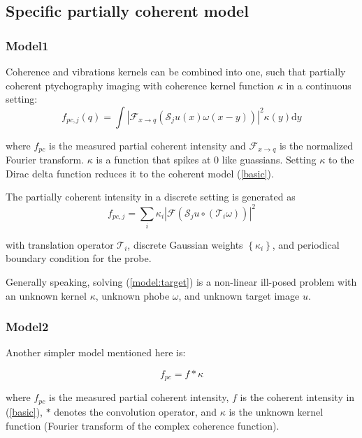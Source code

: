 \documentclass{article}
\numberwithin{equation}{section}
\begin{document}
\subsection{Specific partially coherent model}
 \label{section:specific models}

\subsubsection{Model1\cite{chang}}
Coherence and vibrations kernels can be combined into one, such that partially coherent ptychography imaging with coherence kernel function $\kappa$ in a continuous setting:
\begin{equation}
f_{p c, j}(q) = \int\left|\mathcal{F}_{x \rightarrow q}\left(\mathcal{S}_{j} u(x) \omega(x-y)\right)\right|^{2} \kappa(y) \mathrm{d} y
\end{equation}

where $f_{p c}$ is the measured partial coherent intensity and $\mathcal{F}_{x \rightarrow q}$ is the normalized Fourier transform. $\kappa$ is a function that spikes at 0 like guassians. Setting $\kappa$ to the Dirac delta function reduces it to the coherent model (\ref{basic}).

The partially coherent intensity in a discrete setting is generated as
\begin{equation}
f_{p c, j}=\sum_{i} \kappa_{i}\left|\mathcal{F}\left( \mathcal{S}_{j} u \circ \left(\mathcal{T}_{i} \omega\right) \right)\right|^{2}
\label{model:target}
\end{equation}


with translation operator $\mathcal{T}_{i}$, discrete Gaussian weights $\left\{\kappa_{i}\right\}$, and periodical boundary condition for the probe.

Generally speaking, solving (\ref{model:target}) is a non-linear
ill-posed problem with an unknown kernel $\kappa$, unknown phobe $\omega$, and unknown target image $u$. 

\subsubsection{Model2\cite{psf}}
Another simpler model mentioned here is:

\begin{equation}
\label{simple}
    f_{p c}=f * \kappa
\end{equation}

where $f_{p c}$ is the measured partial coherent intensity, $f$ is the coherent intensity in (\ref{basic}), $*$ denotes the convolution operator, and $\kappa$ is the unknown kernel function (Fourier transform of the complex coherence function). 
\end{document}
